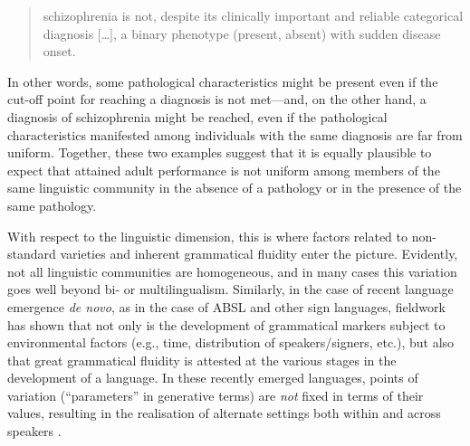 \documentclass[output=paper]{langsci/langscibook}
\begin{document}
\begin{quote}

schizophrenia is not, despite its clinically important and reliable categorical
diagnosis [\dots], a binary phenotype (present, absent) with sudden disease
onset. \parencite[1]{EttingerEtAl2014}

\end{quote}

In other words, some pathological characteristics might be present even if the
cut-off point for reaching a diagnosis is not met—and, on the other hand, a
diagnosis of schizophrenia might be reached, even if the pathological
characteristics manifested among individuals with the same diagnosis are far
from uniform.  Together, these two examples suggest that it is equally
plausible to expect that attained adult performance is not uniform among
members of the same linguistic community in the absence of a pathology or in
the presence of the same pathology.

With respect to the linguistic dimension, this is where factors related to
non-standard varieties and inherent grammatical fluidity enter the picture.
Evidently, not all linguistic communities are homogeneous, and in many cases
this variation goes well beyond bi- or multilingualism. Similarly, in the case
of recent language emergence \emph{de novo}, as in the case of \gls{ABSL}  and other sign languages, fieldwork has shown that
not only is the development of grammatical markers subject to environmental
factors (e.g., time, distribution of speakers/signers, etc.), but also that
great grammatical fluidity is attested at the various stages in the development
of a language. In these recently emerged languages, points of variation
(\enquote{parameters} in generative terms) are \emph{not} fixed in terms of their
values, resulting in the realisation of alternate settings both within and
across speakers \parencite{Washabaugh1986,SandlerEtAl2011}.
\end{document}
